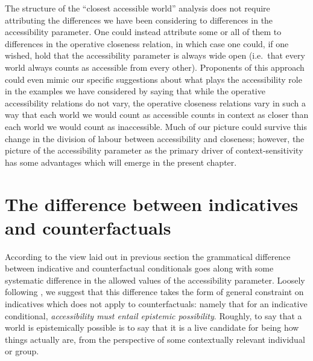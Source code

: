 \documentclass[If.tex]{subfiles}
\begin{document}
The structure of the “closest accessible world” analysis does not require attributing the differences we have been considering to differences in the accessibility parameter.  One could instead attribute some or all of them to differences in the operative closeness relation, in which case one could, if one wished, hold that the accessibility parameter is always wide open (i.e.\ that every world always counts as accessible from every other).  Proponents of this approach could even mimic our specific suggestions about what plays the accessibility role in the examples we have considered by saying that while the operative accessibility relations do not vary, the operative closeness relations vary in such a way that each world we would count as accessible counts in context as closer than each world we would count as inaccessible.  Much of our picture could survive this change in the division of labour between accessibility and closeness; however, the picture of the accessibility parameter as the primary driver of context-sensitivity has some advantages which will emerge in the present chapter.  



\section{The difference between indicatives and counterfactuals} 
\label{sect:indcf}
According to the view laid out in  previous section the grammatical difference between indicative and counterfactual conditionals goes along with some systematic difference in the allowed values of the accessibility parameter.  Loosely following \citet{vonFintelPSC}, we suggest that this difference takes the form of general constraint on indicatives which does not apply to counterfactuals: namely that for an indicative conditional, \emph{accessibility must entail epistemic possibility}.  Roughly, to say that a world is epistemically possible is to say that it is a live candidate for being how things actually are, from the perspective of some contextually relevant individual or group. 
\end{document}
